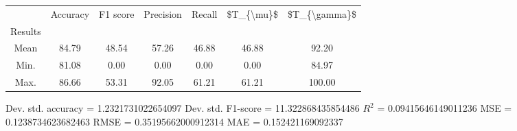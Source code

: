 \begin{tabular}{|c|c|c|c|c|c|c|}
\toprule
{} &  Accuracy &  F1 score &  Precision &  Recall &  \$T\_\{\textbackslash mu\}\$ &  \$T\_\{\textbackslash gamma\}\$ \\
Results &           &           &            &         &            &               \\
\hline
Mean    &     84.79 &     48.54 &      57.26 &   46.88 &      46.88 &         92.20 \\
Min.    &     81.08 &      0.00 &       0.00 &    0.00 &       0.00 &         84.97 \\
Max.    &     86.66 &     53.31 &      92.05 &   61.21 &      61.21 &        100.00 \\
\bottomrule
\end{tabular}

 Dev. std. accuracy = 1.2321731022654097
 Dev. std. F1-score = 11.322868435854486
 $R^2$ = 0.09415646149011236
 MSE = 0.1238734623682463
 RMSE = 0.35195662000912314
 MAE = 0.152421169092337